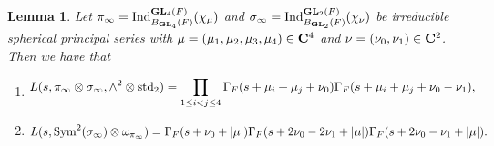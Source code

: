 \documentclass[11pt, reqno]{amsart}
\theoremstyle{plain}
\newtheorem{lemma}[theorem]{Lemma}
\theoremstyle{definition}
\theoremstyle{remark}
\theoremstyle{plain}
\def\C{{\bf C}}
\def\GL{\mathbf{GL}}
\begin{document}
\begin{lemma}\label{L_factor_for_spherical_arch}
   Let $\pi_\infty = {\rm Ind}_{B_{\GL_4}(F)}^{\GL_4(F)}(\chi_{\mu})$ and $\sigma_\infty = {\rm Ind}_{B_{\GL_2}(F)}^{\GL_2(F)}(\chi_{\nu})$ be irreducible spherical principal series with $\mu = (\mu_1,\mu_2,\mu_3,\mu_4) \in \C^4$ and $\nu=(\nu_0,\nu_1) \in \C^2$. Then we have that
   \begin{enumerate}
       \item \begin{align*}
L(s, \pi_\infty \otimes \sigma_\infty, \wedge^2 \otimes {\rm std}_2) &=  \prod_{1\leq i< j \leq 4} \Gamma_F(s +\mu_i+\mu_j + \nu_0) \Gamma_F(s+\mu_i+\mu_j + \nu_0-\nu_1),
\end{align*}
\item  \begin{align*} L(s, {\rm Sym}^2(\sigma_\infty) \otimes \omega_{\pi_\infty} ) = \Gamma_F(s+ \nu_0 + |\mu|) \Gamma_F(s+ 2\nu_0 - 2\nu_1 + |\mu|)\Gamma_F(s+ 2\nu_0 - \nu_1 + |\mu|).
\end{align*}
   \end{enumerate}

   
\end{lemma}
\end{document}
